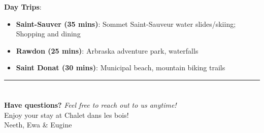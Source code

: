 \documentclass{article}
\newcommand{\chalet}{Chalet dans les bois}
\newcommand{\separator}{\vspace{2em}\hrule}
\newcommand*{\subhead}[2]{\noindent\textbf{#1}: {#2}\vspace{1em}}
\newcommand*{\subsubhead}[2]{\noindent\textbf{#1}: {#2}\vspace{0.25em}}
\begin{document}
\subhead{Day Trips}{}
\begin{itemize}
    \item \subsubhead{Saint-Sauver (35 mins)}{Sommet Saint-Sauveur water slides/skiing; Shopping and dining}
    \item \subsubhead{Rawdon (25 mins)}{Arbraska adventure park, waterfalls}
    \item \subsubhead{Saint Donat (30 mins)}{Municipal beach, mountain biking trails}
\end{itemize}

\separator
\section*{}

\textbf{Have questions? } \textit{Feel free to reach out to us anytime!}\\

Enjoy your stay at \chalet!\\

Neeth, Ewa \& Eugine
\end{document}

